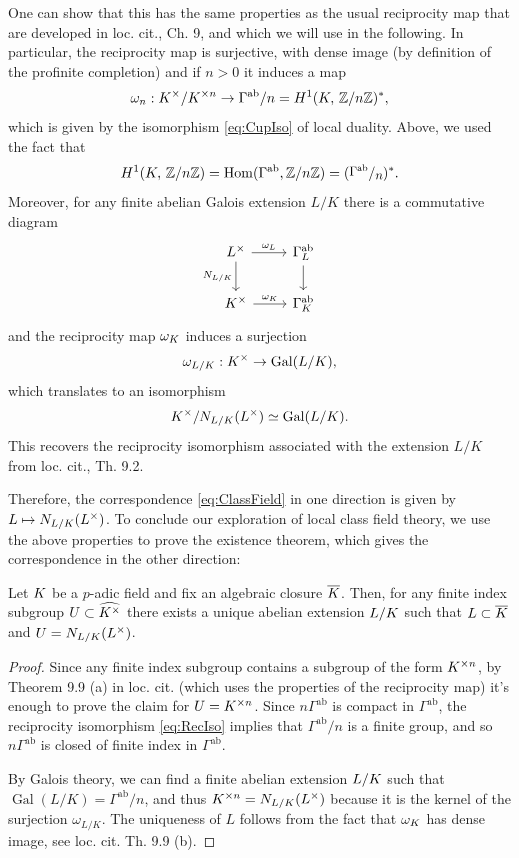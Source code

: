 \documentclass[a4paper, oneside]{memoir}
\begin{document}
\begin{remark}
	One can show that this has the same properties as the usual reciprocity map that are developed in loc. cit., Ch. 9, and which we will use in the following. In particular, the reciprocity map is surjective, with dense image (by definition of the profinite completion) and if $n>0$ it induces a map
	\begin{equation}\label{eq:RecIso}
		\omega_n:K^\times / K^{\times n} \to \Gamma^{\text{ab}}/n = H^{1}( K, \, \mathbb{Z}/n\mathbb{Z} )^*,
	\end{equation}
	which is given by the isomorphism \eqref{eq:CupIso} of local duality. Above, we used the fact that \[\H{1}{\K}{\Zn}=
		\Hom(\Gamma^{\text{ab}},\Zn)=(\sfrac{\Gamma^{\text{ab}}}{n})^*.\]
	Moreover, for any finite abelian Galois extension $L / K$ there is a commutative diagram
	\[
		\begin{tikzcd}\label{eq:NormDiag}
			L^\times \ar[r, "\omega_L"] \ar[d, swap, "N_{L/\K}"] & \Gamma_L^{\text{ab}} \ar[d] \\
			K^\times \ar[r, "\omega_K"]       & \Gamma_K^{\text{ab}}
		\end{tikzcd}
	\]
	and the reciprocity map $\omega_K$ induces a surjection
	\[
		\omega_{L/K}:K^\times \to \operatorname{Gal}(L/K),
	\]
	which translates to an isomorphism \[K^\times / N_{L/K}(L^\times) \simeq \operatorname{Gal}(L/K).\] This recovers the reciprocity isomorphism associated with the extension $L/K$ from loc. cit., Th. 9.2.
\end{remark}

Therefore, the correspondence \eqref{eq:ClassField} in one direction is given by $L \mapsto N_{L/K}(L^\times)$. To conclude our exploration of local class field theory, we use the above properties to prove the existence theorem, which gives the correspondence in the other direction:

\begin{theorem}
	Let $K$ be a $p$-adic field and fix an algebraic closure $\overline{K}$. Then, for any finite index subgroup $U\subset\widehat{K^\times}$
	there exists a unique abelian extension $L / K$ such that $L \subset \overline{K}$ and $U=N_{L/K}(L^\times)$.
\end{theorem}

\begin{proof}
	Since any finite index subgroup contains a subgroup of the form $K^{\times n}$, by Theorem 9.9 (a) in loc. cit. (which uses the properties of the reciprocity map) it's enough to prove the claim for $U=K^{\times n}$. Since $n\Gamma^{\text{ab}}$ is compact in $\Gamma^{\text{ab}}$, the reciprocity isomorphism \eqref{eq:RecIso} implies that $\Gamma^{\text{ab}}/n$ is a finite group, and so $n\Gamma^{\text{ab}}$ is closed of finite index in $\Gamma^{\text{ab}}$.

	By Galois theory, we can find a finite abelian extension $L/K$ such that $\operatorname{Gal}{(L/K)}=\Gamma^{\text{ab}}/n$, and thus $K^{\times n}=N_{L/K}(L^\times)$ because it is the kernel of the surjection $\omega_{L/K}$. The uniqueness of $L$ follows from the fact that $\omega_K$ has dense image, see loc. cit. Th. 9.9 (b).
\end{proof}

\nocite{*}
\printbibliography
\end{document}
